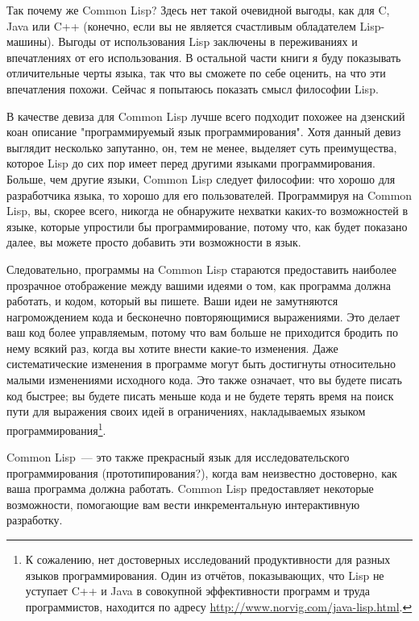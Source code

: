 Так почему же Common Lisp? Здесь нет такой очевидной выгоды, как для C, Java или C++
(конечно, если вы не является счастливым обладателем Lisp-машины). Выгоды от использования
Lisp заключены в переживаниях и впечатлениях от его использования. В остальной части книги
я буду показывать отличительные черты языка, так что вы сможете по себе оценить, на что
эти впечатления похожи. Сейчас я попытаюсь показать смысл философии Lisp.

В качестве девиза для Common Lisp лучше всего подходит похожее на дзенский коан описание
"программируемый язык программирования". Хотя данный девиз выглядит несколько запутанно,
он, тем не менее, выделяет суть преимущества, которое Lisp до сих пор имеет перед другими
языками программирования. Больше, чем другие языки, Common Lisp следует философии: что
хорошо для разработчика языка, то хорошо для его пользователей. Программируя на Common
Lisp, вы, скорее всего, никогда не обнаружите нехватки каких-то возможностей в языке,
которые упростили бы программирование, потому что, как будет показано далее, вы можете
просто добавить эти возможности в язык.

Следовательно, программы на Common Lisp стараются предоставить наиболее прозрачное
отображение между вашими идеями о том, как программа должна работать, и кодом, который вы
пишете. Ваши идеи не замутняются нагромождением кода и бесконечно повторяющимися
выражениями. Это делает ваш код более управляемым, потому что вам больше не приходится
бродить по нему всякий раз, когда вы хотите внести какие-то изменения. Даже
систематические изменения в программе могут быть достигнуты относительно малыми
изменениями исходного кода. Это также означает, что вы будете писать код быстрее; вы
будете писать меньше кода и не будете терять время на поиск пути для выражения своих идей
в ограничениях, накладываемых языком программирования\footnote{К сожалению, нет
  достоверных исследований продуктивности для разных языков программирования. Один из
  отчётов, показывающих, что Lisp не уступает C++ и Java в совокупной эффективности
  программ и труда программистов, находится по адресу
  \url{http://www.norvig.com/java-lisp.html}.}.

Common Lisp~--- это также прекрасный язык для исследовательского программирования
(прототипирования?), когда вам неизвестно достоверно, как ваша программа должна
работать. Common Lisp предоставляет некоторые возможности, помогающие вам вести
инкрементальную интерактивную разработку.

